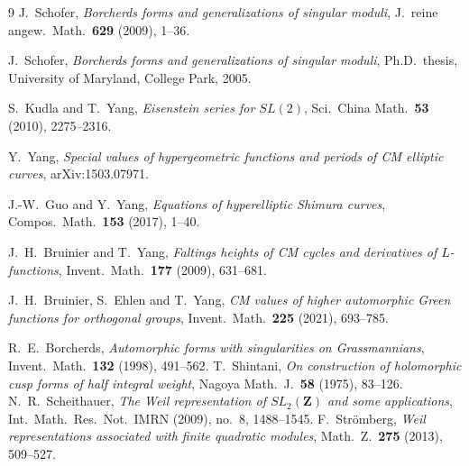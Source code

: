 \documentclass[11pt,reqno]{amsart}
\theoremstyle{plain}
\theoremstyle{definition}
\begin{document}
\begin{thebibliography}{9}
 J.~Schofer, \emph{Borcherds forms and generalizations of singular moduli},
J.\ reine angew.\ Math.\ \textbf{629} (2009), 1--36.

 J.~Schofer, \emph{Borcherds forms and generalizations of singular moduli},
Ph.D.\ thesis, University of Maryland, College Park, 2005.

 S.~Kudla and T.~Yang, \emph{Eisenstein series for $SL(2)$},
Sci.\ China Math.\ \textbf{53} (2010), 2275--2316.

 Y.~Yang, \emph{Special values of hypergeometric functions and periods of CM elliptic
curves}, arXiv:1503.07971.

 J.-W.~Guo and Y.~Yang, \emph{Equations of hyperelliptic Shimura curves},
Compos.\ Math.\ \textbf{153} (2017), 1--40.

 J.~H.~Bruinier and T.~Yang, \emph{Faltings heights of CM cycles and derivatives of
$L$-functions}, Invent.\ Math.\ \textbf{177} (2009), 631--681.

 J.~H.~Bruinier, S.~Ehlen and T.~Yang, \emph{CM values of higher automorphic Green
functions for orthogonal groups}, Invent.\ Math.\ \textbf{225} (2021), 693--785.

 R.~E.~Borcherds, \emph{Automorphic forms with singularities on Grassmannians},
Invent.\ Math.\ \textbf{132} (1998), 491--562.
 T.~Shintani, \emph{On construction of holomorphic cusp forms of half integral
weight}, Nagoya Math.\ J.\ \textbf{58} (1975), 83--126.
 N.~R.~Scheithauer, \emph{The Weil representation of $SL_2(\mathbf Z)$ and some
applications}, Int.\ Math.\ Res.\ Not.\ IMRN (2009), no.~8, 1488--1545.
 F.~Str\"omberg, \emph{Weil representations associated with finite quadratic
modules}, Math.\ Z.\ \textbf{275} (2013), 509--527.
\end{thebibliography}
\end{document}
